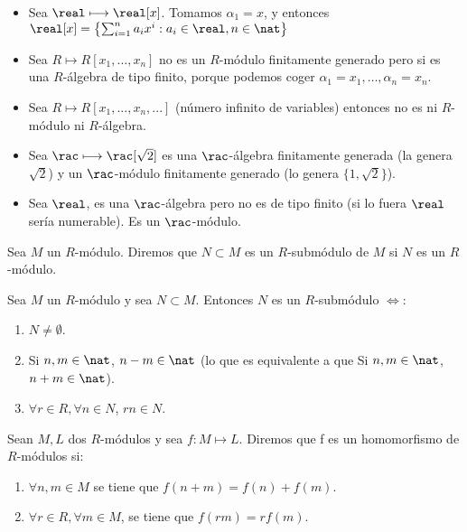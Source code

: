 \begin{example}
	\begin{itemize}
		\item Sea $\real \longmapsto \real[x]$. Tomamos $\alpha_1=x$, y entonces $\real[x]=\left\{ \sum_{i=1}^n a_ix^i: a_i \in \real, n\in \nat  \right\}$
		\item Sea $R \longmapsto R[x_1,\dots,x_n]$ no es un $R$-módulo finitamente generado pero si es una $R$-álgebra de tipo finito, porque podemos coger $\alpha_1=x_1,\dots,\alpha_n=x_n$.
		\item Sea $R \longmapsto R[x_1,...,x_n,...]$ (número infinito de variables) entonces no es ni $R$-módulo ni $R$-álgebra.
		\item Sea $\rac \longmapsto \rac[\sqrt{2}]$ es una $\rac$-álgebra finitamente generada (la genera $\sqrt{2}$) y un $\rac$-módulo finitamente generado (lo genera $\{ 1, \sqrt{2} \}$).
		\item Sea $\real$, es una $\rac$-álgebra pero no es de tipo finito (si lo fuera $\real$ sería numerable). Es un $\rac$-módulo.
	\end{itemize}
\end{example}

\begin{defn}[R-submódulo]
	Sea $M$ un $R$-módulo. Diremos que $N \subset M$ es un $R$-submódulo de $M$ si $N$ es un $R$-módulo.
\end{defn}
\begin{prop}
	Sea $M$ un $R$-módulo y sea $N \subset M$. Entonces $N$ es un $R$-submódulo $\Leftrightarrow$:
	\begin{enumerate}
		\item $N \neq \emptyset$.
		\item Si $n,m \in \nat$, $n-m \in \nat$ (lo que es equivalente a que Si $n,m \in \nat$, $n+m \in \nat$).
		\item $\forall r \in R, \forall n \in N$, $rn \in N$.
	\end{enumerate}
\end{prop}

\begin{defn}
	Sean $M,L$ dos $R$-módulos y sea $f:M\longmapsto L$. Diremos que f es un homomorfismo de $R$-módulos si:
	\begin{enumerate}
		\item $\forall n,m \in M$ se tiene que $f(n+m)=f(n)+f(m)$.
		\item $\forall r \in R,\forall m \in M$, se tiene que $f(rm)=rf(m)$.
	\end{enumerate}
\end{defn}

